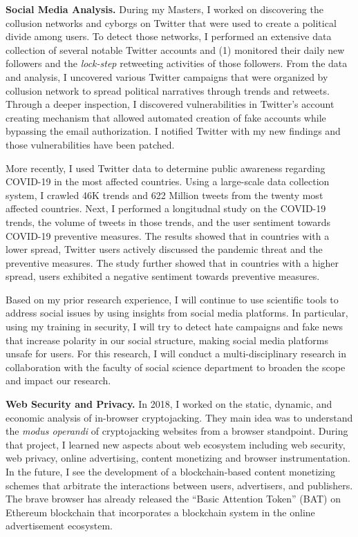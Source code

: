 \documentclass{NSF}
\newcommand{\BfPara}[1]{{\noindent\textbf{#1.}}\xspace}
\begin{document}
\BfPara{Social Media Analysis} During my Masters, I worked on discovering the collusion networks and cyborgs on Twitter that were used to create a political divide among users. To detect those networks, I performed an extensive data collection of several notable Twitter accounts and (1) monitored their daily new followers and the {\em lock-step} retweeting activities of those followers. From the data and analysis, I uncovered various Twitter campaigns that were organized by collusion network to spread political narratives through trends and retweets. Through a deeper inspection, I discovered vulnerabilities in Twitter's account creating mechanism that allowed automated creation of fake accounts while bypassing the email authorization. I notified Twitter with my new findings and those vulnerabilities have been patched.  

More recently, I used Twitter data to determine public awareness regarding COVID-19 in the most affected countries. Using a large-scale data collection system, I crawled 46K trends and 622 Million tweets from the twenty most affected countries. Next, I performed a longitudnal study on the COVID-19 trends, the volume of tweets in those trends, and the user sentiment towards COVID-19 preventive measures. The results showed that in countries with a lower spread, Twitter users actively discussed the pandemic threat and the preventive measures. The study further showed that in countries with a higher spread, users exhibited a negative sentiment towards preventive measures. 

Based on my prior research experience, I will continue to use scientific tools to address social issues by using insights from social media platforms. In particular, using my training in security, I will try to detect hate campaigns and fake news that increase polarity in our social structure, making social media platforms unsafe for users. For this research, I will conduct a multi-disciplinary research in collaboration with the faculty of social science department to broaden the scope and impact our research.  

\BfPara{Web Security and Privacy} In 2018, I worked on the static, dynamic, and economic analysis of in-browser cryptojacking. They main idea was to understand the {\em modus operandi} of cryptojacking websites from a browser standpoint. During that project, I learned new aspects about web ecosystem including web security, web privacy, online advertising, content monetizing and browser instrumentation. In the future, I see the development of a blockchain-based content monetizing schemes that arbitrate the interactions between users, advertisers, and publishers. The brave browser has already released the ``Basic Attention Token'' (BAT) on Ethereum blockchain that incorporates a blockchain system in the online advertisement ecosystem. 
\end{document}
